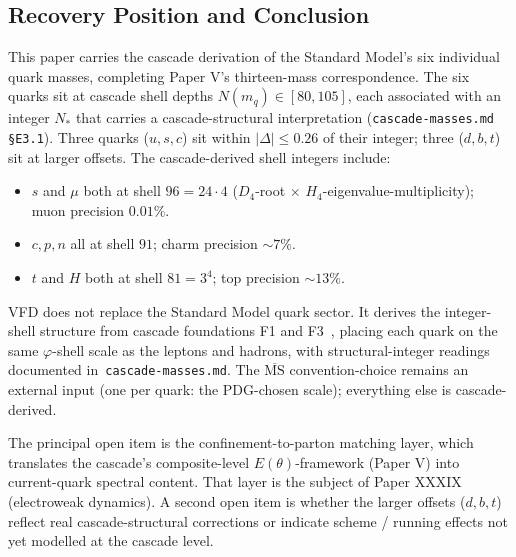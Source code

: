 \documentclass[12pt]{article}
\theoremstyle{definition}
\theoremstyle{remark}
\newcommand{\MSbar}{\overline{\mathrm{MS}}}
\begin{document}
\subsection{Recovery Position and Conclusion}
This paper carries the cascade derivation of the Standard Model's six individual quark masses, completing Paper V's thirteen-mass correspondence. The six quarks sit at cascade shell depths $N(m_q) \in [80, 105]$, each associated with an integer $N_*$ that carries a cascade-structural interpretation (\texttt{cascade-masses.md §E3.1}). Three quarks ($u, s, c$) sit within $|\Delta| \le 0.26$ of their integer; three ($d, b, t$) sit at larger offsets. The cascade-derived shell integers include:
\begin{itemize}
\item $s$ and $\mu$ both at shell $96 = 24 \cdot 4$ ($D_4$-root $\times$ $H_4$-eigenvalue-multiplicity); muon precision $0.01\%$.
\item $c, p, n$ all at shell $91$; charm precision $\sim 7\%$.
\item $t$ and $H$ both at shell $81 = 3^4$; top precision $\sim 13\%$.
\end{itemize}
VFD does not replace the Standard Model quark sector. It derives the integer-shell structure from cascade foundations F1 and F3~\citep{SmartXXXVI}, placing each quark on the same $\varphi$-shell scale as the leptons and hadrons, with structural-integer readings documented in~\texttt{cascade-masses.md}. The $\MSbar$ convention-choice remains an external input (one per quark: the PDG-chosen scale); everything else is cascade-derived.

The principal open item is the confinement-to-parton matching layer, which translates the cascade's composite-level $E(\theta)$-framework (Paper V) into current-quark spectral content. That layer is the subject of Paper XXXIX (electroweak dynamics). A second open item is whether the larger offsets ($d, b, t$) reflect real cascade-structural corrections or indicate scheme / running effects not yet modelled at the cascade level.
\end{document}
